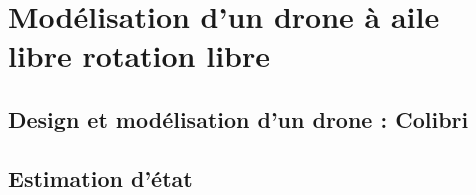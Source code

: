 \chapter{Modélisation d'un drone à aile libre rotation libre}
\minitoc

\section{Design et modélisation d'un drone : Colibri}

\section{Estimation d'état}








